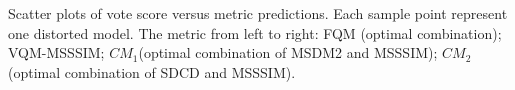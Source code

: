 Scatter plots of vote score versus metric predictions. Each sample point represent one distorted model. The metric from left to right: FQM \cite{Tian_2004}(optimal combination); VQM-MSSSIM; $CM_1$(optimal combination of MSDM2 \cite{Lavou__2011} and MSSSIM); $CM_2$(optimal combination of SDCD and MSSSIM).